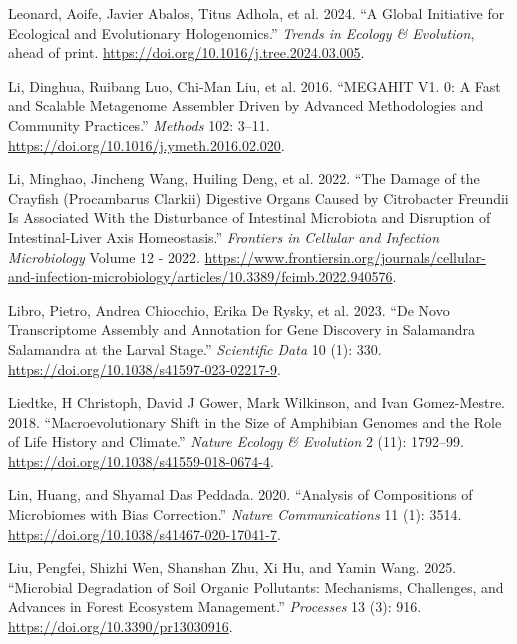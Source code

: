 \documentclass[
  12pt,
]{article}
\newlength{\cslhangindent}
\newenvironment{CSLReferences}[2] %
 {\begin{list}{}{%
  \setlength{\itemindent}{0pt}
  \setlength{\leftmargin}{0pt}
  \setlength{\parsep}{0pt}
  \ifodd #1
   \setlength{\leftmargin}{\cslhangindent}
   \setlength{\itemindent}{-1\cslhangindent}
  \fi
  \setlength{\itemsep}{#2\baselineskip}}}
 {\end{list}}
\begin{document}
\begin{CSLReferences}{1}{1}
{Leonard, Aoife, Javier Abalos, Titus Adhola, et al.} 2024. {``A Global
Initiative for Ecological and Evolutionary Hologenomics.''} \emph{Trends
in Ecology \& Evolution}, ahead of print.
\url{https://doi.org/10.1016/j.tree.2024.03.005}.

Li, Dinghua, Ruibang Luo, Chi-Man Liu, et al. 2016. {``{MEGAHIT} V1. 0:
A Fast and Scalable Metagenome Assembler Driven by Advanced
Methodologies and Community Practices.''} \emph{Methods} 102: 3--11.
\url{https://doi.org/10.1016/j.ymeth.2016.02.020}.

Li, Minghao, Jincheng Wang, Huiling Deng, et al. 2022. {``The {Damage}
of the {Crayfish} ({Procambarus} {Clarkii}) {Digestive} {Organs}
{Caused} by {Citrobacter} {Freundii} {Is} {Associated} {With} the
{Disturbance} of {Intestinal} {Microbiota} and {Disruption} of
{Intestinal}-{Liver} {Axis} {Homeostasis}.''} \emph{Frontiers in
Cellular and Infection Microbiology} Volume 12 - 2022.
\url{https://www.frontiersin.org/journals/cellular-and-infection-microbiology/articles/10.3389/fcimb.2022.940576}.

Libro, Pietro, Andrea Chiocchio, Erika De Rysky, et al. 2023. {``De Novo
Transcriptome Assembly and Annotation for Gene Discovery in {Salamandra}
Salamandra at the Larval Stage.''} \emph{Scientific Data} 10 (1): 330.
\url{https://doi.org/10.1038/s41597-023-02217-9}.

Liedtke, H Christoph, David J Gower, Mark Wilkinson, and Ivan
Gomez-Mestre. 2018. {``Macroevolutionary Shift in the Size of Amphibian
Genomes and the Role of Life History and Climate.''} \emph{Nature
Ecology \& Evolution} 2 (11): 1792--99.
\url{https://doi.org/10.1038/s41559-018-0674-4}.

Lin, Huang, and Shyamal Das Peddada. 2020. {``Analysis of Compositions
of Microbiomes with Bias Correction.''} \emph{Nature Communications} 11
(1): 3514. \url{https://doi.org/10.1038/s41467-020-17041-7}.

Liu, Pengfei, Shizhi Wen, Shanshan Zhu, Xi Hu, and Yamin Wang. 2025.
{``Microbial {Degradation} of {Soil} {Organic} {Pollutants}:
{Mechanisms}, {Challenges}, and {Advances} in {Forest} {Ecosystem}
{Management}.''} \emph{Processes} 13 (3): 916.
\url{https://doi.org/10.3390/pr13030916}.


\end{CSLReferences}
\end{document}
